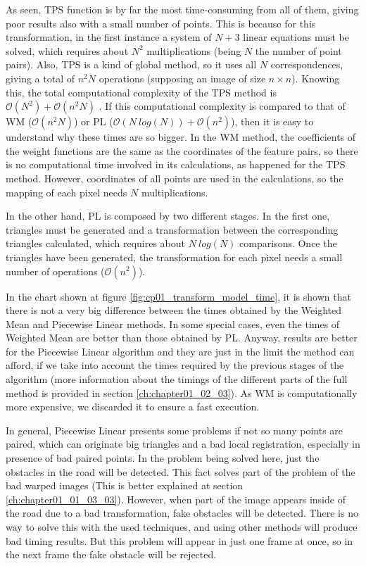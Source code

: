 As seen, \ac{TPS} function is by far the most time-consuming from all of them, giving poor results also with a small number of points. This is because for this transformation, in the first instance a system of $N + 3$ linear equations must be solved, which requires about $N^2$ multiplications (being $N$ the number of point pairs). Also, TPS is a kind of global method, so it uses all $N$ correspondences, giving a total of $n^2N$ operations (supposing an image of size $n \times n$). Knowing this, the total computational complexity of the TPS method is $\mathcal{O}(N^2) + \mathcal{O}(n^2N)$ \citep{zagorchev2006comparative}. If this computational complexity is compared to that of \ac{WM} ($\mathcal{O}(n^2N)$) or \ac{PL} ($\mathcal{O}(N~log(N)) + \mathcal{O}(n^2)$), then it is easy to understand why these times are so bigger. In the \acf{WM} method, the coefficients of the weight functions are the same as the coordinates of the feature pairs, so there is no computational time involved in its calculations, as happened for the \ac{TPS} method. However, coordinates of all points are used in the calculations, so the mapping of each pixel needs $N$ multiplications.

In the other hand, \acf{PL} is composed by two different stages. In the first one, triangles must be generated and a transformation between the corresponding triangles calculated, which requires about $N~log(N)$ comparisons. Once the triangles have been generated, the transformation for each pixel needs a small number of operations ($\mathcal{O}(n^2)$).

In the chart shown at figure \ref{fig:cp01_transform_model_time}, it is shown that there is not a very big difference between the times obtained by the Weighted Mean and Piecewise Linear methods. In some special cases, even the times of Weighted Mean are better than those obtained by \ac{PL}. Anyway, results are better for the Piecewise Linear algorithm and they are just in the limit the method can afford, if we take into account the times required by the previous stages of the algorithm (more information about the timings of the different parts of the full method is provided in section \ref{ch:chapter01_02_03}). As \ac{WM} is computationally more expensive, we discarded it to ensure a fast execution.

In general, Piecewise Linear presents some problems if not so many points are paired, which can originate big triangles and a bad local registration, especially in presence of bad paired points. In the problem being solved here, just the obstacles in the road will be detected. This fact solves part of the problem of the bad warped images (This is better explained at section \ref{ch:chapter01_01_03_03}). However, when part of the image appears inside of the road due to a bad transformation, fake obstacles will be detected. There is no way to solve this with the used techniques, and using other methods will produce bad timing results. But this problem will appear in just one frame at once, so in the next frame the fake obstacle will be rejected.

